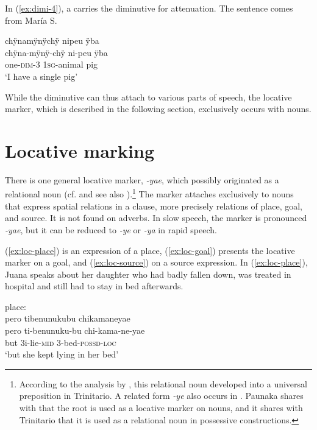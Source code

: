 In (\ref{ex:dimi-4}), a  carries the diminutive for attenuation. The sentence comes from María S.

\ea\label{ex:dimi-4}
\begingl
\glpreamble chÿnamÿnÿchÿ nipeu ÿba\\
\gla chÿna-mÿnÿ-chÿ ni-peu ÿba\\
\glb one-\textsc{dim}-3 1\textsc{sg}-animal pig\\
\glft ‘I have a single pig’
\endgl
\trailingcitation{[rxx-e181024l.059]}
\xe



While the diminutive can thus attach to various parts of speech, the locative marker, which is described in the following section, exclusively occurs with nouns.



\section{Locative marking}\label{sec:Locative}

There is one general locative marker, \textit{-yae}, which possibly originated as a relational noun (cf. \citealt[]{Rose2019a} and see also ).\footnote{According to the analysis by \citet[]{Rose2019a}, this relational noun developed into a universal preposition in Trinitario. A related form \textit{-ye} also occurs in  \citep[cf.][150]{Danielsen2007}. Paunaka shares with  that the root is used as a locative marker on nouns, and it shares with Trinitario that it is used as a relational noun in possessive constructions.} The marker attaches exclusively to nouns that express spatial relations in a clause, more precisely relations of place, goal, and source. It is not found on adverbs. In slow speech, the marker is pronounced \textit{-yae}, but it can be reduced to \textit{-ye} or \textit{-ya} in rapid speech. 

(\ref{ex:loc-place}) is an expression of a place, (\ref{ex:loc-goal}) presents the locative marker on a goal, and (\ref{ex:loc-source}) on a source expression. In (\ref{ex:loc-place}), Juana speaks about her daughter who had badly fallen down, was treated in hospital and still had to stay in bed afterwards.

\ea\label{ex:loc-place}
\begingl
\glpreamble \textup{place:}\\pero tibenunukubu chikamaneyae\\
\gla pero ti-benunuku-bu chi-kama-ne-yae\\
\glb but 3i-lie-\textsc{mid} 3-bed-\textsc{possd}-\textsc{loc}\\
\glft ‘but she kept lying in her bed’
\endgl
\trailingcitation{[jxx-p110923l-1.485]}
\xe

